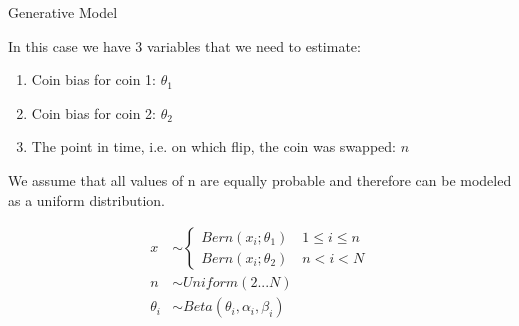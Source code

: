 \documentclass[
  ignorenonframetext,
]{beamer}
\begin{document}
\begin{frame}{Generative Model}
\protect\hypertarget{generative-model}{}

\footnotesize

In this case we have 3 variables that we need to estimate:

\begin{enumerate}
  \item Coin bias for coin 1: $\theta_1$
  \item Coin bias for coin 2: $\theta_2$
  \item The point in time, i.e. on which flip, the coin was swapped: $n$
\end{enumerate}

We assume that all values of n are equally probable and therefore can be
modeled as a uniform distribution.

\begin{equation}
\begin{aligned}
  x &\sim   
  \begin{cases}
      Bern(x_{i};\theta_{1}) \quad 1 \le i \le n \\
      Bern(x_{i};\theta_{2}) \quad n < i < N  
  \end{cases} \\
  n &\sim Uniform(2...N) \\
  \theta_{i} &\sim Beta(\theta_{i}, \alpha_i,\beta_i)
\end{aligned}
\end{equation}

\end{frame}
\end{document}
